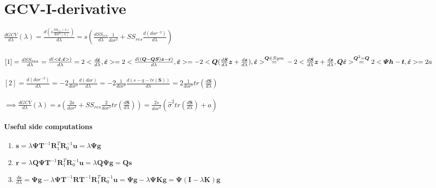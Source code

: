 \documentclass[11pt,twoside]{report}
\begin{document}
\section{GCV-I-derivative}
$ \frac{dGCV}{d\lambda}(\lambda) = \frac{d(s\frac{SS_{res}(\lambda)}{dor^2(\lambda)})}{d\lambda} = s (\frac{dSS_{res}}{d\lambda}\frac{1}{dor^2} + SS_{res}\frac{d(dor^{-2})}{d\lambda}) $\\
\\
$[1] = \frac{dSS_{res}}{d\lambda} = \frac{d(<\hat{\mathbold{\varepsilon}},\hat{\mathbold{\varepsilon}}> )}{d\lambda} = 2<\frac{d\hat{\mathbold{\varepsilon}}}{d\lambda},\hat{\mathbold{\varepsilon}}> = 2 < \frac{d((\mathbold{Q}-\mathbold{Q}\mathbold{S})\mathbold{z}-\mathbf{r})}{d\lambda}, \hat{\mathbold{\varepsilon}}> = -2<\mathbold{Q}(\frac{d\mathbold{S}}{d\lambda}\mathbold{z} + \frac{d\mathbold{s}}{d\lambda}), \hat{\mathbold{\varepsilon}}> \overset{\mathbold{Q}\in Sym}{=}\\ -2<\frac{d\mathbold{S}}{d\lambda}\mathbold{z} + \frac{d\mathbold{s}}{d\lambda},\mathbold{Q} \hat{\mathbold{\varepsilon}}> \overset{\mathbold{Q}^2 = \mathbold{Q}}{=} 2<\mathbold{\Psi}\mathbold{h} - \mathbold{t}, \hat{\mathbold{\varepsilon}}> = 2a$\\
\\
$[2]= \frac{d(dor^{-2})}{d\lambda} = -2\frac{1}{dor^3}\frac{d(dor)}{d\lambda} = -2\frac{1}{dor^3}\frac{d(s-q-tr(\mathbold{S}))}{d\lambda} = 2\frac{1}{dor^3}tr(\frac{d\mathbold{S}}{d\lambda})$\\
\\
$\implies \frac{dGCV}{d\lambda}(\lambda) = s (\frac{2a}{dor^2} + SS_{res}\frac{2}{dor^3}tr(\frac{d\mathbold{S}}{d\lambda})) = \frac{2s}{{dor}^2}(\hat{\sigma}^2tr(\frac{d\mathbold{S}}{d\lambda}) + a)$

\paragraph{Useful side computations}
\begin{enumerate}
	\item $ \mathbf{s} = \lambda \boldsymbol{\Psi} \textbf{T}^{-1} \textbf{R}_1^T\textbf{R}_0^{-1}\textbf{u} = \lambda\boldsymbol{\Psi}\mathbf{g} $
	\item $ \mathbf{r} = \lambda \textbf{Q}\boldsymbol{\Psi} \textbf{T}^{-1} \textbf{R}_1^T\textbf{R}_0^{-1}\textbf{u} = \lambda \textbf{Q}\boldsymbol{\Psi}\mathbf{g} = \textbf{Q}\mathbf{s}$
	\item $ \frac{d\mathbold{s}}{d\lambda} = \boldsymbol{\Psi}\mathbf{g} - \lambda \boldsymbol{\Psi} \textbf{T}^{-1} \textbf{R}\textbf{T}^{-1} \textbf{R}_1^T\textbf{R}_0^{-1}\textbf{u} =\boldsymbol{\Psi}\mathbf{g} - \lambda \boldsymbol{\Psi} \textbf{K}\mathbf{g} = \boldsymbol{\Psi}(\mathbf{I}-\lambda\mathbf{K})\mathbf{g} $
\end{enumerate}
\end{document}
